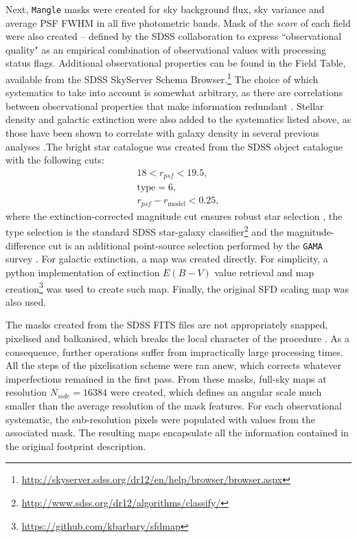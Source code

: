\qquad Next, \texttt{Mangle} masks were created for sky background flux, sky variance and average PSF FWHM in all five photometric bands. Mask of the \textit{score} of each field were also created -- defined by the SDSS collaboration to express ``observational quality" as an empirical combination of observational values with processing status flags. Additional observational properties can be found in the Field Table, available from the SDSS SkyServer Schema Browser.\footnote{\url{http://skyserver.sdss.org/dr12/en/help/browser/browser.aspx}} The choice of which systematics to take into account is somewhat arbitrary, as there are correlations between observational properties that make information redundant \citep{Boris2013}. Stellar density and galactic extinction were also added to the systematics listed above, as those have been shown to correlate with galaxy density in several previous analyses \citep[e.g.][]{Thomas2011, ElvinPoole2017}.The bright star catalogue was created from the SDSS object catalogue with the following cuts:
\begin{eqnarray}
18 < r_{psf} < 19.5,\\ \nonumber
\text{type} = 6,\\
r_{psf} - r_{\text{model}} < 0.25,\nonumber
\end{eqnarray}
where the extinction-corrected magnitude cut ensures robust star selection \citep{Padm2007}, the type selection is the standard SDSS star-galaxy classifier\footnote{\url{http://www.sdss.org/dr12/algorithms/classify/}} and the magnitude-difference cut is an additional point-source selection performed by the \texttt{GAMA} survey \citep[e.g.][]{Christodoulou2012}. For galactic extinction, a \healpix map was created directly. For simplicity, a python implementation of extinction $E(B-V)$ value retrieval and map creation\footnote{\url{https://github.com/kbarbary/sfdmap}} was used to create such map. Finally, the original SFD scaling map \citep{Schlegel1998} was also used.

\qquad The \mangle masks created from the SDSS FITS files are not appropriately snapped, pixelised and balkanised, which breaks the local character of the \mangle procedure \citep{2008Mangle}. As a consequence, further operations suffer from impractically large processing times. All the steps of the \mangle pixelisation scheme were ran anew, which corrects whatever imperfections remained in the first pass. From these masks, full-sky \healpix maps at resolution $N_{side}=16384$ were created, which defines an angular scale much smaller than the average resolution of the mask features. For each observational systematic, the sub-resolution \healpix pixels were populated with values from the associated \mangle mask. The resulting \healpix maps encapsulate all the information contained in the original footprint description.

